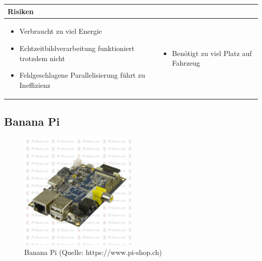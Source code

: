 \begin{table}[h]
\begin{tabular}{p{}p{}}


 \textbf{Risiken} & \\ \hline
	 
\begin{itemize}
\item Verbraucht zu viel Energie
\item Echtzeitbildverarbeitung funktioniert trotzdem nicht
\item Fehlgeschlagene Parallelisierung führt zu Ineffizienz
\end{itemize}
&
\begin{itemize}
\item Benötigt zu viel Platz auf Fahrzeug
\end{itemize}
 
\end{tabular}
\end{table}

\pagebreak

\subsection{Banana Pi}

\begin{figure}[h!]%
\centering
\includegraphics[width=0.5\textwidth]{fig/PIBanana.jpg}
\caption{Banana Pi (Quelle: https://www.pi-shop.ch)}
\label{fig:Banana Pi}
\end{figure}

